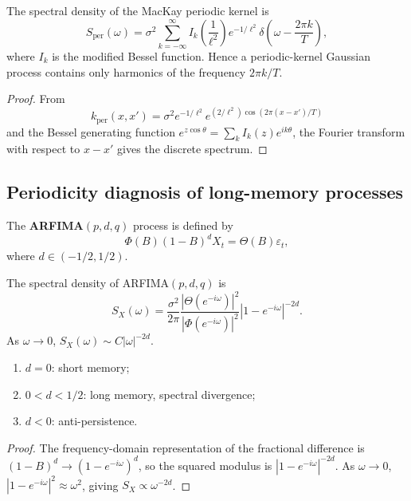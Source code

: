 \begin{proposition}\label{prop:gp_spectrum}
The spectral density of the MacKay periodic kernel is
\[
S_{\mathrm{per}}(\omega)=\sigma^2\sum_{k=-\infty}^{\infty}I_k\left(\frac1{\ell^2}\right)e^{-1/\ell^2}\delta\left(\omega-\frac{2\pi k}{T}\right),
\]
where $I_k$ is the modified Bessel function. Hence a periodic-kernel Gaussian process contains only harmonics of the frequency $2\pi k/T$.
\end{proposition}

\begin{proof}
From
\[
k_{\mathrm{per}}(x,x')=\sigma^2e^{-1/\ell^2}e^{(2/\ell^2)\cos(2\pi(x-x')/T)}
\]
and the Bessel generating function $e^{z\cos\theta}=\sum_kI_k(z)e^{ik\theta}$, the Fourier transform with respect to $x-x'$ gives the discrete spectrum.
\end{proof}

\subsection{Periodicity diagnosis of long-memory processes}

\begin{definition}\label{def:arfima}
The \textbf{ARFIMA}$(p,d,q)$ process is defined by
\[
\Phi(B)(1-B)^dX_t=\Theta(B)\varepsilon_t,
\]
where $d\in(-1/2,1/2)$.
\end{definition}

\begin{proposition}\label{prop:arfima_spectrum}
The spectral density of ARFIMA$(p,d,q)$ is
\[
S_X(\omega)=\frac{\sigma^2}{2\pi}\frac{|\Theta(e^{-i\omega})|^2}{|\Phi(e^{-i\omega})|^2}|1-e^{-i\omega}|^{-2d}.
\]
As $\omega\to0$, $S_X(\omega)\sim C|\omega|^{-2d}$.
\begin{enumerate}[label=(\roman*)]
    \item $d=0$: short memory;
    \item $0<d<1/2$: long memory, spectral divergence;
    \item $d<0$: anti-persistence.
\end{enumerate}
\end{proposition}

\begin{proof}
The frequency-domain representation of the fractional difference is $(1-B)^d\to(1-e^{-i\omega})^d$, so the squared modulus is $|1-e^{-i\omega}|^{-2d}$. As $\omega\to0$, $|1-e^{-i\omega}|^2\approx\omega^2$, giving $S_X\propto\omega^{-2d}$.
\end{proof}

